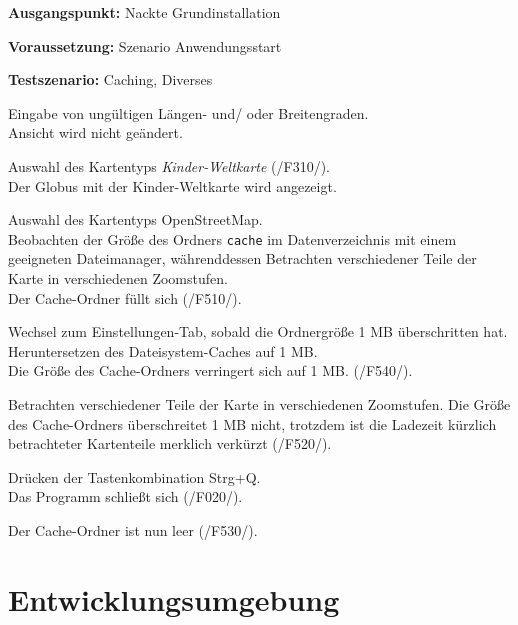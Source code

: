 \documentclass[10pt]{scrreprt}
\newcommand{\sfbf}[1]{\textbf{\sffamily #1}}
\newcommand{\ziel}[1]{{\fontsize{9.5}{11}\textsf{/#1/}}}
\newenvironment{details}[1][6pt]{%
  \parskip#1 \parindent6mm \raggedright%
  \def\item{\par\ignorespaces\hangindent=5mm \hangafter1}}{%
  \par\ignorespaces}
\begin{document}
\vspace{1.0cm}
\begin{details}[2pt]
\item \sfbf{Ausgangspunkt:} Nackte Grundinstallation 
\item \sfbf{Voraussetzung:} Szenario Anwendungsstart
\item \sfbf{Testszenario:} Caching, Diverses
\end{details}
\vspace{2mm}
\begin{enumerate}[leftmargin = 2.2cm, resume]
\item Eingabe von ungültigen Längen- und/ oder Breitengraden.\\ Ansicht wird nicht geändert.
\item Auswahl des Kartentyps \textit{Kinder-Weltkarte} (\ziel{F310}).\\Der Globus mit der Kinder-Weltkarte wird angezeigt.
\item Auswahl des Kartentyps OpenStreetMap.\\Beobachten der Größe des Ordners \texttt{cache} im Datenverzeichnis mit einem geeigneten Dateimanager, währenddessen Betrachten verschiedener Teile der Karte in verschiedenen Zoomstufen.\\Der Cache-Ordner füllt sich (\ziel{F510}).
\item Wechsel zum Einstellungen-Tab, sobald die Ordnergröße 1 MB überschritten hat. Heruntersetzen des Dateisystem-Caches auf 1 MB.\\Die Größe des Cache-Ordners verringert sich auf 1 MB. (\ziel{F540}).
\item Betrachten verschiedener Teile der Karte in verschiedenen Zoomstufen. Die Größe des Cache-Ordners überschreitet 1 MB nicht, trotzdem ist die Ladezeit kürzlich betrachteter Kartenteile merklich verkürzt (\ziel{F520}).
\item Drücken der Tastenkombination Strg+Q.\\Das Programm schließt sich (\ziel{F020}).
\item Der Cache-Ordner ist nun leer (\ziel{F530}).
\end{enumerate}



\chapter{Entwicklungsumgebung}
\end{document}
